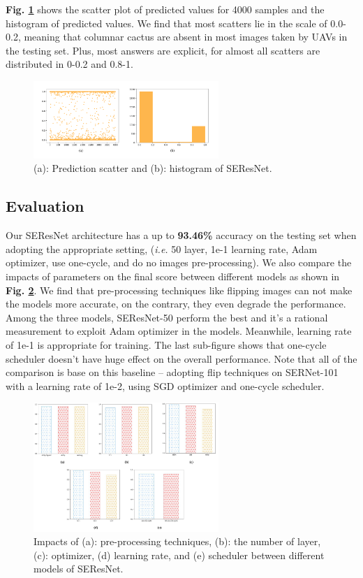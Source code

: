 \documentclass[10pt,twocolumn,letterpaper]{article}
\begin{document}
\textbf{Fig. \ref{seresresults}} shows the scatter plot of predicted values for 4000 samples and the histogram of predicted values. We find that most scatters lie in the scale of 0.0-0.2, meaning that columnar cactus are absent in most images taken by UAVs in the testing set. Plus, most answers are explicit, for almost all scatters are distributed in 0-0.2 and 0.8-1.

\begin{figure}[h]
\centering
\includegraphics[width=7cm]{seres_best.pdf}
\caption{(a): Prediction scatter and (b): histogram of \textsf{SEResNet}.}
\label{seresresults}
\end{figure}

\subsection{Evaluation}

Our \textsf{SEResNet} architecture has a up to \textbf{93.46\%} accuracy on the testing set when adopting the appropriate setting, (\textit{i.e.} 50 layer, 1e-1 learning rate, Adam optimizer, use one-cycle, and do no images pre-processing). We also compare the impacts of parameters on the final score between different models as shown in \textbf{Fig. \ref{serescompare}}. We find that pre-processing techniques like flipping images can not make the models more accurate, on the contrary, they even degrade the performance. Among the three models, \textsf{SEResNet-50} perform the best and it's a rational measurement to exploit Adam optimizer in the models. Meanwhile, learning rate of 1e-1 is appropriate for training. The last sub-figure shows that one-cycle scheduler doesn't have huge effect on the overall performance. Note that all of the comparison is base on this baseline -- adopting flip techniques on \textsf{SERNet-101} with a learning rate of 1e-2, using SGD optimizer and one-cycle scheduler.

\begin{figure}[h]
\centering
\includegraphics[width=7cm]{se-res.pdf}
\caption{Impacts of (a): pre-processing techniques, (b): the number of layer, (c): optimizer, (d) learning rate, and (e) scheduler between different models of \textsf{SEResNet}.}
\label{serescompare}
\end{figure}
\end{document}
